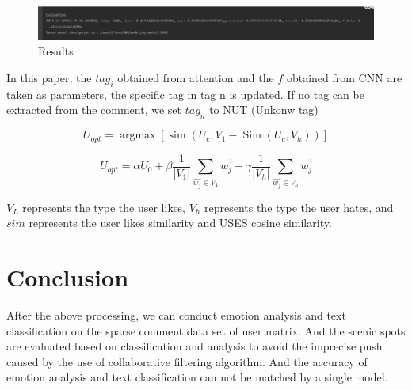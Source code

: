 \documentclass[conference]{IEEEtran}
\begin{document}
\begin{figure}[H]
    \centering
    \includegraphics[width=0.8\linewidth]{figure/Picture3}
    \caption{Results}
\end{figure}


In this paper, the $tag_i$ obtained from attention and the $f$ obtained from CNN are taken as parameters, the specific tag in tag n is updated. If no tag can be extracted from the comment, we set $tag_n$ to NUT (Unkonw tag)

$$U_{o p t}=\operatorname{argmax}\left[\operatorname{sim}\left(U_{c}, V_{1}-\operatorname{Sim}\left(U_{c}, V_{h}\right)\right)\right]$$

$$U_{opt}=\alpha U_0+\beta \frac{1}{|V_1|}\sum_{\vec{w_j}\in V_1}{\vec{w_j}}-\gamma\frac{1}{|V_h|}\sum_{\vec{w_j}\in V_h}{\vec{w_j}}$$

$V_L$ represents the type the user likes, $V_h$ represents the type the user hates, and $sim$ represents the user likes similarity and USES cosine similarity.



\section{Conclusion}
After the above processing, we can conduct emotion analysis and text classification on the sparse comment data set of user matrix. And the scenic spots are evaluated based on classification and analysis to avoid the imprecise push caused by the use of collaborative filtering algorithm. And the accuracy of emotion analysis and text classification can not be matched by a single model.
\end{document}
